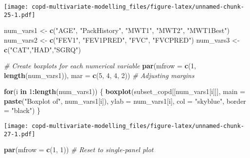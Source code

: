 \documentclass[
]{article}
\newenvironment{Shaded}{\begin{snugshade}}{\end{snugshade}}
\newcommand{\AttributeTok}[1]{\textcolor[rgb]{0.13,0.29,0.53}{#1}}
\newcommand{\CommentTok}[1]{\textcolor[rgb]{0.56,0.35,0.01}{\textit{#1}}}
\newcommand{\ControlFlowTok}[1]{\textcolor[rgb]{0.13,0.29,0.53}{\textbf{#1}}}
\newcommand{\DecValTok}[1]{\textcolor[rgb]{0.00,0.00,0.81}{#1}}
\newcommand{\FunctionTok}[1]{\textcolor[rgb]{0.13,0.29,0.53}{\textbf{#1}}}
\newcommand{\NormalTok}[1]{#1}
\newcommand{\OtherTok}[1]{\textcolor[rgb]{0.56,0.35,0.01}{#1}}
\newcommand{\SpecialCharTok}[1]{\textcolor[rgb]{0.81,0.36,0.00}{\textbf{#1}}}
\newcommand{\StringTok}[1]{\textcolor[rgb]{0.31,0.60,0.02}{#1}}
\begin{document}
\texttt{[image: copd-multivariate-modelling\_files/figure-latex/unnamed-chunk-25-1.pdf]}

\begin{Shaded}
\begin{Highlighting}[]
\NormalTok{num\_vars1 }\OtherTok{\textless{}{-}} \FunctionTok{c}\NormalTok{(}\StringTok{"AGE"}\NormalTok{, }\StringTok{"PackHistory"}\NormalTok{, }\StringTok{"MWT1"}\NormalTok{, }\StringTok{"MWT2"}\NormalTok{, }\StringTok{"MWT1Best"}\NormalTok{) }
\NormalTok{num\_vars2 }\OtherTok{\textless{}{-}} \FunctionTok{c}\NormalTok{(}\StringTok{"FEV1"}\NormalTok{, }\StringTok{"FEV1PRED"}\NormalTok{, }\StringTok{"FVC"}\NormalTok{, }\StringTok{"FVCPRED"}\NormalTok{)}
\NormalTok{num\_vars3 }\OtherTok{\textless{}{-}} \FunctionTok{c}\NormalTok{(}\StringTok{"CAT"}\NormalTok{,}\StringTok{"HAD"}\NormalTok{,}\StringTok{"SGRQ"}\NormalTok{)}
\end{Highlighting}
\end{Shaded}

\begin{Shaded}
\begin{Highlighting}[]
\CommentTok{\# Create boxplots for each numerical variable}
\FunctionTok{par}\NormalTok{(}\AttributeTok{mfrow =} \FunctionTok{c}\NormalTok{(}\DecValTok{1}\NormalTok{, }\FunctionTok{length}\NormalTok{(num\_vars1)), }\AttributeTok{mar =} \FunctionTok{c}\NormalTok{(}\DecValTok{5}\NormalTok{, }\DecValTok{4}\NormalTok{, }\DecValTok{4}\NormalTok{, }\DecValTok{2}\NormalTok{))  }\CommentTok{\# Adjusting margins}

\ControlFlowTok{for}\NormalTok{(i }\ControlFlowTok{in} \DecValTok{1}\SpecialCharTok{:}\FunctionTok{length}\NormalTok{(num\_vars1)) \{}
  \FunctionTok{boxplot}\NormalTok{(subset\_copd[[num\_vars1[i]]], }\AttributeTok{main =} \FunctionTok{paste}\NormalTok{(}\StringTok{"Boxplot of"}\NormalTok{, num\_vars1[i]), }
          \AttributeTok{ylab =}\NormalTok{ num\_vars1[i], }\AttributeTok{col =} \StringTok{"skyblue"}\NormalTok{, }\AttributeTok{border =} \StringTok{"black"}\NormalTok{)}
\NormalTok{\}}
\end{Highlighting}
\end{Shaded}

\texttt{[image: copd-multivariate-modelling\_files/figure-latex/unnamed-chunk-27-1.pdf]}

\begin{Shaded}
\begin{Highlighting}[]
\FunctionTok{par}\NormalTok{(}\AttributeTok{mfrow =} \FunctionTok{c}\NormalTok{(}\DecValTok{1}\NormalTok{, }\DecValTok{1}\NormalTok{))  }\CommentTok{\# Reset to single{-}panel plot}
\end{Highlighting}
\end{Shaded}
\end{document}
